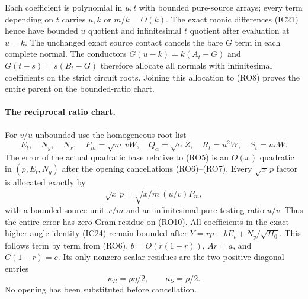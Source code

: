 Each coefficient is polynomial in $u,t$ with bounded pure-source
arrays; every term depending on $t$ carries $u,k$ or $m/k=O(k)$.
The exact monic differences (IC21) hence have bounded $u$ quotient
and infinitesimal $t$ quotient after evaluation at $u=k$. The
unchanged exact source contact cancels the bare $G$ term in each
complete normal. The conductors
$G(u-k)=k(A_t-G)$ and $G(t-s)=s(B_t-G)$ therefore allocate
all normals with infinitesimal coefficients on the strict circuit
roots. Joining this allocation to (RO8) proves the entire parent
on the bounded-ratio chart.

\paragraph{The reciprocal ratio chart.}
For $v/u$ unbounded use the homogeneous root list
\[
 E_t,\quad N_y,\quad N_x,\quad P_m=\sqrt m\,vW,
 \quad Q_\alpha=\sqrt\alpha Z,\quad R_t=u^2W,
 \quad S_t=uvW.                                      \tag{RO10}
\]
The error of the actual quadratic base relative to (RO5) is an
$O(x)$ quadratic in $(p,E_t,N_y)$ after the opening cancellations
(RO6)--(RO7). Every $\sqrt x\,p$ factor is allocated exactly by
\[
 \sqrt x\,p=\sqrt{x/m}\,(u/v)P_m,
\]
with a bounded source unit $x/m$ and an infinitesimal pure-testing
ratio $u/v$. Thus the entire error has zero Gram residue on (RO10).
All coefficients in the exact higher-angle identity (IC24) remain
bounded after $Y=rp+bE_t+N_y/\sqrt{H_0}$. This follows term
by term from (RO6), $b=O(r(1-r))$, $Ar=a$, and $C(1-r)=c$.
Its only nonzero scalar residues are the two positive diagonal entries
\[
                 \kappa_R=\rho\eta/2,\qquad
                 \kappa_S=\rho/2.                  \tag{RO11}
\]
No opening has been substituted before cancellation.

